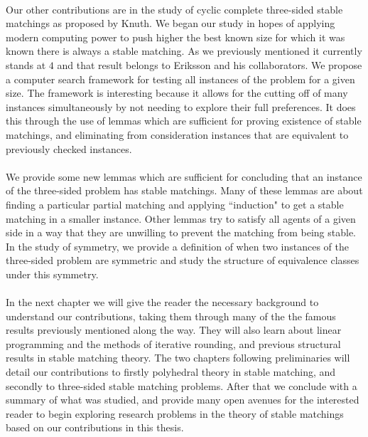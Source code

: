 \paragraph{}
Our other contributions are in the study of cyclic complete three-sided stable matchings as proposed by Knuth. We began our study in hopes of applying modern computing power to push higher the best known size for which it was known there is always a stable matching. As we previously mentioned it currently stands at $4$ and that result belongs to Eriksson and his collaborators. We propose a computer search framework for testing all instances of the problem for a given size. The framework is interesting because it allows for the cutting off of many instances simultaneously by not needing to explore their full preferences. It does this through the use of lemmas which are sufficient for proving existence of stable matchings, and eliminating from consideration instances that are equivalent to previously checked instances. 
\paragraph{}
We provide some new lemmas which are sufficient for concluding that an instance of the three-sided problem has stable matchings. Many of these lemmas are about finding a particular partial matching and applying ``induction" to get a stable matching in a smaller instance. Other lemmas try to satisfy all agents of a given side in a way that they are unwilling to prevent the matching from being stable. In the study of symmetry, we provide a definition of when two instances of the three-sided problem are symmetric and study the structure of equivalence classes under this symmetry.
\paragraph{}
In the next chapter we will give the reader the necessary background to understand our contributions, taking them through many of the the famous results previously mentioned along the way. They will also learn about linear programming and the methods of iterative rounding, and previous structural results in stable matching theory. The two chapters following preliminaries will detail our contributions to firstly polyhedral theory in stable matching, and secondly to three-sided stable matching problems. After that we conclude with a summary of what was studied, and provide many open avenues for the interested reader to begin exploring research problems in the theory of stable matchings based on our contributions in this thesis.
